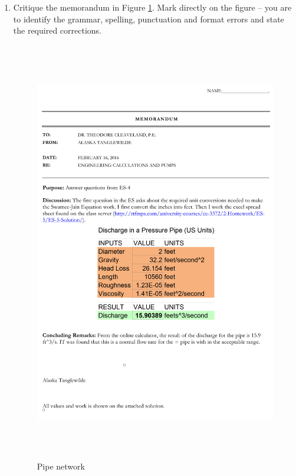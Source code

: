 \documentclass[11pt]{article}
\begin{document}
\begin{enumerate}
\clearpage

\item Critique the memorandum in Figure \ref{fig:memorandum}.  Mark directly on the figure -- you are to identify the grammar, spelling, punctuation and format errors and state the required corrections.

\begin{figure}[h!] %
\centering
   \includegraphics[height=7.3in]{Exam-1-Memo.jpg}
   \caption{Pipe network}
   \label{fig:memorandum} 
\end{figure}

\end{enumerate}
\end{document}
